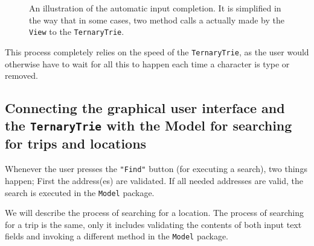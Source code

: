 \documentclass[a4paper,11pt]{article}
\begin{document}
\begin{figure}[!h]
\centering
{}
\caption{An illustration of the automatic input completion. It is simplified in the way that in some cases, two method calls a actually made by the \texttt{View} to the \texttt{TernaryTrie}.}
\label{fig:autocompletion}
\end{figure}

This process completely relies on the speed of the \texttt{TernaryTrie}, as the user would otherwise have to wait for all this to happen each time a character is type or removed.

\subsection{Connecting the graphical user interface and the \texttt{TernaryTrie} with the Model for searching for trips and locations}
Whenever the user presses the \texttt{"Find"} button (for executing a search), two things happen; First the address(es) are validated. If all needed addresses are valid, the search is executed in the \texttt{Model} package.

We will describe the process of searching for a location. The process of searching for a trip is the same, only it includes validating the contents of both input text fields and invoking a different method in the \texttt{Model} package.
\end{document}
